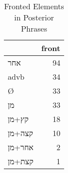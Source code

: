 \begin{table}[htbp!]
\centering
\caption{Fronted Elements in Posterior Phrases}
\label{table:post_front}
\begin{tabular}{lr}
\toprule
{} &  front \\
\midrule
\texthebrew{אחר}                 &     94 \\
advb                             &     34 \\
Ø                                &     33 \\
\texthebrew{מן}                  &     33 \\
\texthebrew{קץ}+\texthebrew{מן}  &     18 \\
\texthebrew{קצה}+\texthebrew{מן} &     10 \\
\texthebrew{אחר}+\texthebrew{מן} &      2 \\
\texthebrew{קצת}+\texthebrew{מן} &      1 \\
\bottomrule
\end{tabular}
\end{table}
